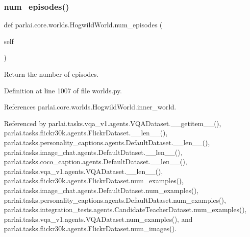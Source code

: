 \subsubsection{\texorpdfstring{num\+\_\+episodes()}{num\_episodes()}}
{\footnotesize\ttfamily def parlai.\+core.\+worlds.\+Hogwild\+World.\+num\+\_\+episodes (\begin{DoxyParamCaption}\item[{}]{self }\end{DoxyParamCaption})}

\begin{DoxyVerb}Return the number of episodes.\end{DoxyVerb}
 

Definition at line 1007 of file worlds.\+py.



References parlai.\+core.\+worlds.\+Hogwild\+World.\+inner\+\_\+world.



Referenced by parlai.\+tasks.\+vqa\+\_\+v1.\+agents.\+V\+Q\+A\+Dataset.\+\_\+\+\_\+getitem\+\_\+\+\_\+(), parlai.\+tasks.\+flickr30k.\+agents.\+Flickr\+Dataset.\+\_\+\+\_\+len\+\_\+\+\_\+(), parlai.\+tasks.\+personality\+\_\+captions.\+agents.\+Default\+Dataset.\+\_\+\+\_\+len\+\_\+\+\_\+(), parlai.\+tasks.\+image\+\_\+chat.\+agents.\+Default\+Dataset.\+\_\+\+\_\+len\+\_\+\+\_\+(), parlai.\+tasks.\+coco\+\_\+caption.\+agents.\+Default\+Dataset.\+\_\+\+\_\+len\+\_\+\+\_\+(), parlai.\+tasks.\+vqa\+\_\+v1.\+agents.\+V\+Q\+A\+Dataset.\+\_\+\+\_\+len\+\_\+\+\_\+(), parlai.\+tasks.\+flickr30k.\+agents.\+Flickr\+Dataset.\+num\+\_\+examples(), parlai.\+tasks.\+image\+\_\+chat.\+agents.\+Default\+Dataset.\+num\+\_\+examples(), parlai.\+tasks.\+personality\+\_\+captions.\+agents.\+Default\+Dataset.\+num\+\_\+examples(), parlai.\+tasks.\+integration\+\_\+tests.\+agents.\+Candidate\+Teacher\+Dataset.\+num\+\_\+examples(), parlai.\+tasks.\+vqa\+\_\+v1.\+agents.\+V\+Q\+A\+Dataset.\+num\+\_\+examples(), and parlai.\+tasks.\+flickr30k.\+agents.\+Flickr\+Dataset.\+num\+\_\+images().

